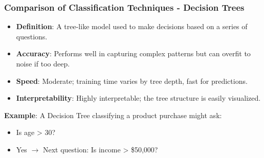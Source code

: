 \documentclass[aspectratio=169]{beamer}
\begin{document}
\begin{frame}[fragile]
    \frametitle{Comparison of Classification Techniques - Decision Trees}
    \begin{itemize}
        \item \textbf{Definition}: A tree-like model used to make decisions based on a series of questions.
        \item \textbf{Accuracy}: Performs well in capturing complex patterns but can overfit to noise if too deep.
        \item \textbf{Speed}: Moderate; training time varies by tree depth, fast for predictions.
        \item \textbf{Interpretability}: Highly interpretable; the tree structure is easily visualized.
    \end{itemize}
    \textbf{Example}: A Decision Tree classifying a product purchase might ask:
    \begin{itemize}
        \item Is age > 30?
        \item Yes $\rightarrow$ Next question: Is income > \$50,000?
    \end{itemize}
\end{frame}
\end{document}
